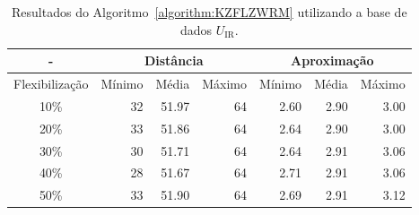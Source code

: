 \begin{table}[!htb]
  \caption{Resultados do Algoritmo~\ref{algorithm:KZFLZWRM} utilizando a base de dados $U_{\text{IR}}$.}
  \label{table:PZXCAILB}
  \centering
  \begin{tabular}{|c|r|r|r|r|r|r|}
    \hline
      -            & \multicolumn{3}{c|}{Distância}             & \multicolumn{3}{c|}{Aproximação}           \\ \hline
    Flexibilização & Mínimo       & Média        & Máximo       & Mínimo       & Média        & Máximo       \\ \hline  
    10\%           & 32           & 51.97        & 64           & 2.60         & 2.90         & 3.00         \\ \hline
    20\%           & 33           & 51.86        & 64           & 2.64         & 2.90         & 3.00         \\ \hline
    30\%           & 30           & 51.71        & 64           & 2.64         & 2.91         & 3.06         \\ \hline
    40\%           & 28           & 51.67        & 64           & 2.71         & 2.91         & 3.06         \\ \hline
    50\%           & 33           & 51.90        & 64           & 2.69         & 2.91         & 3.12         \\ \hline    
  \end{tabular}
\end{table}